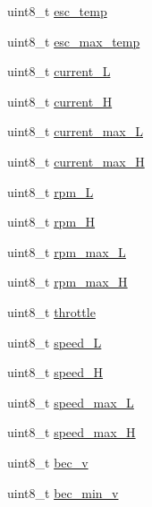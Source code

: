\begin{DoxyCompactItemize}
\item 
uint8\+\_\+t \hyperlink{structHOTT__AIRESC__MSG__s_a4026a2adb5e7a0813dad596d36e65dd0}{esc\+\_\+temp}
\item 
uint8\+\_\+t \hyperlink{structHOTT__AIRESC__MSG__s_a8665289bb1130b2bef36b13439be7ae2}{esc\+\_\+max\+\_\+temp}
\item 
uint8\+\_\+t \hyperlink{structHOTT__AIRESC__MSG__s_a5d3f848588bd2f035797d3240251ad87}{current\+\_\+\+L}
\item 
uint8\+\_\+t \hyperlink{structHOTT__AIRESC__MSG__s_a30490616b978e8f0a43eb97d41b5f520}{current\+\_\+\+H}
\item 
uint8\+\_\+t \hyperlink{structHOTT__AIRESC__MSG__s_aff3d9ceb984433aa9ba72fa387b4d1f0}{current\+\_\+max\+\_\+\+L}
\item 
uint8\+\_\+t \hyperlink{structHOTT__AIRESC__MSG__s_a0fe1a579ba847e733e2bd2c5e82a1215}{current\+\_\+max\+\_\+\+H}
\item 
uint8\+\_\+t \hyperlink{structHOTT__AIRESC__MSG__s_a74d6e8d4ddf0b61e9396009ff1caf4ca}{rpm\+\_\+\+L}
\item 
uint8\+\_\+t \hyperlink{structHOTT__AIRESC__MSG__s_a756655cec219ae84ff2bfda1e3351a9b}{rpm\+\_\+\+H}
\item 
uint8\+\_\+t \hyperlink{structHOTT__AIRESC__MSG__s_aacaa9d3ca9480de9685e3e6b3989cc70}{rpm\+\_\+max\+\_\+\+L}
\item 
uint8\+\_\+t \hyperlink{structHOTT__AIRESC__MSG__s_ada66e1131109d651b3dc2669055a09fe}{rpm\+\_\+max\+\_\+\+H}
\item 
uint8\+\_\+t \hyperlink{structHOTT__AIRESC__MSG__s_a020bbcf9471ffb665b1e1074592014fa}{throttle}
\item 
uint8\+\_\+t \hyperlink{structHOTT__AIRESC__MSG__s_a2379d1964a2601c2830ce73da296df4d}{speed\+\_\+\+L}
\item 
uint8\+\_\+t \hyperlink{structHOTT__AIRESC__MSG__s_af3155b99a8db8018eb3035d77ab14c90}{speed\+\_\+\+H}
\item 
uint8\+\_\+t \hyperlink{structHOTT__AIRESC__MSG__s_a8144d95b516cbd1cee1586d6f8c9f81b}{speed\+\_\+max\+\_\+\+L}
\item 
uint8\+\_\+t \hyperlink{structHOTT__AIRESC__MSG__s_aeebe60005521609ebfc3711968d3e9bf}{speed\+\_\+max\+\_\+\+H}
\item 
uint8\+\_\+t \hyperlink{structHOTT__AIRESC__MSG__s_ac5d0e06574bf37537e7fa3e5e4f11a3b}{bec\+\_\+v}
\item 
uint8\+\_\+t \hyperlink{structHOTT__AIRESC__MSG__s_a580327a5da9c24eee98c7bdba55425ed}{bec\+\_\+min\+\_\+v}
\item 

\end{DoxyCompactItemize}
